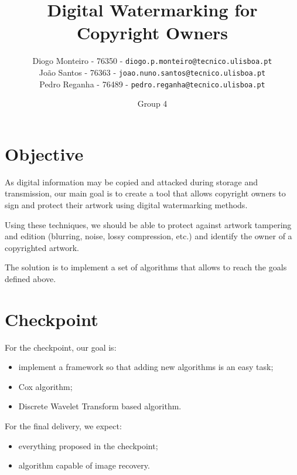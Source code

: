 \documentclass[10pt]{article}
\begin{document}
\title{Digital Watermarking for Copyright Owners}
\author{
    Diogo Monteiro - 76350 - \texttt{diogo.p.monteiro@tecnico.ulisboa.pt} \\
    João Santos - 76363 - \texttt{joao.nuno.santos@tecnico.ulisboa.pt} \\
    Pedro Reganha - 76489 - \texttt{pedro.reganha@tecnico.ulisboa.pt} \\
}
\date{Group 4}

\maketitle

\section{Objective}
    As digital information may be copied and attacked during storage and transmission, our main goal is to create a tool that allows copyright owners to sign and protect their artwork using digital watermarking methods.
    
   Using these techniques, we should be able to protect against artwork tampering and edition (blurring, noise, lossy compression, etc.) and identify the owner of a copyrighted artwork.
    
    The solution is to implement a set of algorithms that allows to reach the goals defined above.

\section{Checkpoint}
For the checkpoint, our goal is:

    \begin{itemize}
        \item implement a framework so that adding new algorithms is an easy task;
        \item Cox algorithm;
        \item Discrete Wavelet Transform based algorithm.
    \end{itemize}
    
    For the final delivery, we expect:
    \begin{itemize}
        \item everything proposed in the checkpoint;
        \item algorithm capable of image recovery.
    \end{itemize}
    
    
\end{document}
